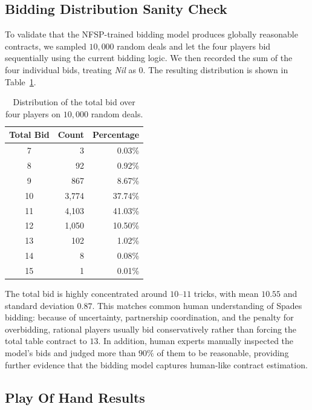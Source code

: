 \documentclass{article}
\begin{document}
\subsection{Bidding Distribution Sanity Check}

To validate that the NFSP-trained bidding model produces globally reasonable contracts, we sampled $10{,}000$ random deals and let the four players bid sequentially using the current bidding logic. We then recorded the sum of the four individual bids, treating \textit{Nil} as $0$. The resulting distribution is shown in Table~\ref{tab:bid-sum-distribution}.

\begin{table}[!htbp]
\centering
\caption{Distribution of the total bid over four players on $10{,}000$ random deals.}
\label{tab:bid-sum-distribution}
\small
\begin{tabular}{crr}
\toprule
\textbf{Total Bid} & \textbf{Count} & \textbf{Percentage} \\
\midrule
7  & 3     & 0.03\% \\
8  & 92    & 0.92\% \\
9  & 867   & 8.67\% \\
10 & 3,774 & 37.74\% \\
11 & 4,103 & 41.03\% \\
12 & 1,050 & 10.50\% \\
13 & 102   & 1.02\% \\
14 & 8     & 0.08\% \\
15 & 1     & 0.01\% \\
\bottomrule
\end{tabular}
\end{table}

The total bid is highly concentrated around $10$--$11$ tricks, with mean $10.55$ and standard deviation $0.87$. This matches common human understanding of Spades bidding: because of uncertainty, partnership coordination, and the penalty for overbidding, rational players usually bid conservatively rather than forcing the total table contract to $13$. In addition, human experts manually inspected the model's bids and judged more than $90\%$ of them to be reasonable, providing further evidence that the bidding model captures human-like contract estimation.
\FloatBarrier

\subsection{Play Of Hand Results}
\end{document}
